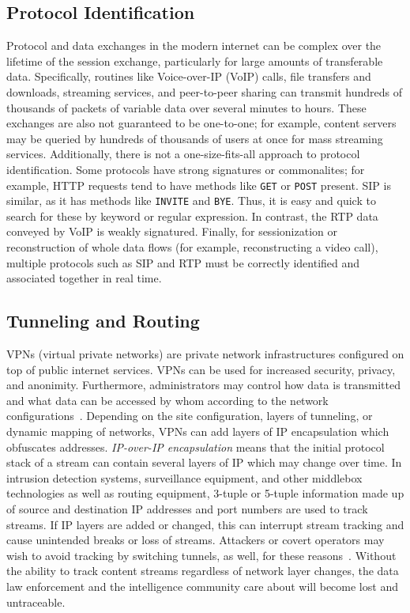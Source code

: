 \subsection{Protocol Identification}

Protocol and data exchanges in the modern internet can be complex over the lifetime of the session exchange, particularly for large amounts of transferable data. Specifically, routines like Voice-over-IP (VoIP) calls, file transfers and downloads, streaming services, and peer-to-peer sharing can transmit hundreds of thousands of packets of variable data over several minutes to hours. These exchanges are also not guaranteed to be one-to-one; for example, content servers may be queried by hundreds of thousands of users at once for mass streaming services. Additionally, there is not a one-size-fits-all approach to protocol identification. Some protocols have strong signatures or commonalites; for example, HTTP requests tend to have methods like \texttt{GET} or \texttt{POST} present. SIP is similar, as it has methods like \texttt{INVITE} and \texttt{BYE}. Thus, it is easy and quick to search for these by keyword or regular expression. In contrast, the RTP data conveyed by VoIP is weakly signatured. Finally, for sessionization or reconstruction of whole data flows (for example, reconstructing a video call), multiple protocols such as SIP and RTP must be correctly identified and associated together in real time.

\subsection{Tunneling and Routing}

VPNs (virtual private networks) are private network infrastructures configured on top of public internet services. VPNs can be used for increased security, privacy, and anonimity. Furthermore, administrators may control how data is transmitted and what data can be accessed by whom according to the network configurations~\cite{Zhipeng2018VPNAB}. Depending on the site configuration, layers of tunneling, or dynamic mapping of networks, VPNs can add layers of IP encapsulation which obfuscates addresses. \textit{IP-over-IP encapsulation} means that the initial protocol stack of a stream can contain several layers of IP which may change over time. In intrusion detection systems, surveillance equipment, and other middlebox technologies as well as routing equipment, 3-tuple or 5-tuple information made up of source and destination IP addresses and port numbers are used to track streams. If IP layers are added or changed, this can interrupt stream tracking and cause unintended breaks or loss of streams. Attackers or covert operators may wish to avoid tracking by switching tunnels, as well, for these reasons~\cite{iscx-vpn-paper}. Without the ability to track content streams regardless of network layer changes, the data law enforcement and the intelligence community care about will become lost and untraceable.

